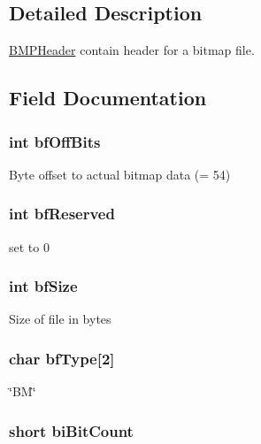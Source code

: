 \subsection{Detailed Description}
\hyperlink{struct_b_m_p_header}{B\-M\-P\-Header} contain header for a bitmap file. 

\subsection{Field Documentation}
\hypertarget{struct_b_m_p_header_a932d1972e87bc927f385b50d374dbaad}{
\subsubsection[{bf\-Off\-Bits}]{\setlength{\rightskip}{0pt plus 5cm}int bf\-Off\-Bits}}\label{struct_b_m_p_header_a932d1972e87bc927f385b50d374dbaad}
Byte offset to actual bitmap data (= 54) \hypertarget{struct_b_m_p_header_af31f2c0e9e9e9adf7327c70ca2b52a64}{
\subsubsection[{bf\-Reserved}]{\setlength{\rightskip}{0pt plus 5cm}int bf\-Reserved}}\label{struct_b_m_p_header_af31f2c0e9e9e9adf7327c70ca2b52a64}
set to 0 \hypertarget{struct_b_m_p_header_abff21fa85cedcc94d4949ed5214e8dc2}{
\subsubsection[{bf\-Size}]{\setlength{\rightskip}{0pt plus 5cm}int bf\-Size}}\label{struct_b_m_p_header_abff21fa85cedcc94d4949ed5214e8dc2}
Size of file in bytes \hypertarget{struct_b_m_p_header_ac6cb60ac603fc181a760b3d252c85829}{
\subsubsection[{bf\-Type}]{\setlength{\rightskip}{0pt plus 5cm}char bf\-Type\mbox{[}2\mbox{]}}}\label{struct_b_m_p_header_ac6cb60ac603fc181a760b3d252c85829}
\char`\"{}\-B\-M\char`\"{} \hypertarget{struct_b_m_p_header_aba79d93395d17ce8b58efd73a3ccd4c5}{
\subsubsection[{bi\-Bit\-Count}]{\setlength{\rightskip}{0pt plus 5cm}short bi\-Bit\-Count}}\label{struct_b_m_p_header_aba79d93395d17ce8b58efd73a3ccd4c5}

